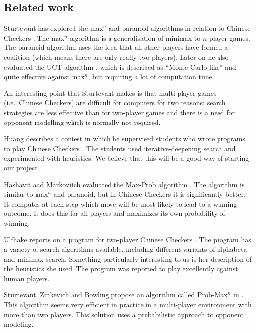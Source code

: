\documentclass[a4paper,11pt]{article}
\begin{document}
\subsection{Related work}
Sturtevant has explored the max$^n$ and paranoid algorithms in
relation to Chinese Checkers
\cite{springerlink:10.1007/978-3-540-40031-8_8}. The max$^n$ algorithm
is a generalisation of minimax to $n$-player games. The paranoid
algorithm uses the idea that all other players have formed a coalition
(which means there are only really two players). Later on he also
evaluated the UCT algorithm
\cite{springerlink:10.1007/978-3-540-87608-3_4}, which is described as
``Monte-Carlo-like'' and quite effective against max$^n$, but
requiring a lot of computation time.

An interesting point that Sturtevant makes is that multi-player games
(i.e.~Chinese Checkers) are difficult for computers for two reasons:
search strategies are less effective than for two-player games and
there is a need for opponent modelling which is normally not required.

Huang describes a contest in which he supervised students who wrote
programs to play Chinese Checkers \cite{Huang:2001:SGP:378593.378708}.
The students used iter\-ative-deep\-ening search and experimented with
heuristics. We believe that this will be a good way of starting our
project.

Hashavit and Markovitch evaluated the Max-Prob algorithm
\cite{Hashavit}. The algorithm is similar to max$^n$ and paranoid, but
in Chinese Checkers it is significantly better. It computes at each
step which move will be most likely to lead to a winning outcome. It
does this for all players and maximizes its own probability of
winning.

Ulfhake reports on a program for two-player Chinese Checkers
\cite{ulfhake}. The program has a variety of search algorithms
available, including different variants of alphabeta and minimax
search. Something particularly interesting to us is her description of
the heuristics she used. The program was reported to play excellently
against human players.

Sturtevant, Zinkevich and Bowling propose an algorithm called Prob-Max$^n$
in \cite{probmaxn}. This algorithm seems very efficient in practice in a
multi-player environment with more than two players. This solution uses
a probabilistic approach to opponent modeling.
\end{document}

